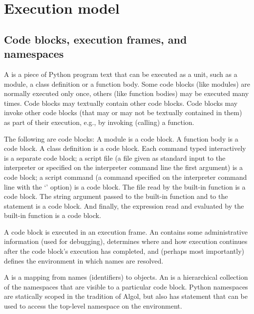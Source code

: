 \chapter{Execution model \label{execmodel}}

\section{Code blocks, execution frames, and namespaces \label{execframes}}

A  is a piece
of Python program text that can be executed as a unit, such as a
module, a class definition or a function body.  Some code blocks (like
modules) are normally executed only once, others (like function
bodies) may be executed many times.  Code blocks may textually contain
other code blocks.  Code blocks may invoke other code blocks (that may
or may not be textually contained in them) as part of their execution,
e.g., by invoking (calling) a function.

The following are code blocks: A module is a code block.  A function
body is a code block.  A class definition is a code block.  Each
command typed interactively is a separate code block; a script file (a
file given as standard input to the interpreter or specified on the
interpreter command line the first argument) is a code block; a script
command (a command specified on the interpreter command line with the
`' option) is a code block.  The file read by the built-in
function  is a code block.  The string argument
passed to the built-in function  and to the
 statement is a code block.  And finally,
the expression read and evaluated by the built-in function
 is a code block.

A code block is executed in an execution frame.  An  contains some administrative
information (used for debugging), determines where and how execution
continues after the code block's execution has completed, and (perhaps
most importantly) defines the environment in which names are resolved.

A  is a mapping from names
(identifiers) to objects.  An  is
a hierarchical collection of the namespaces that are visible to a
particular code block.  Python namespaces are statically scoped in the
tradition of Algol, but also has  statement that can
be used to access the top-level namespace on the environment.

